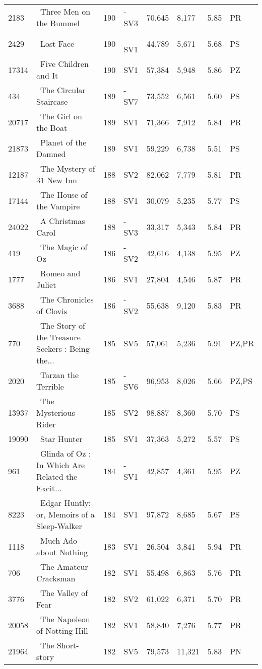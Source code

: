 \begin{longtable}{l | l | l | l | l | l | l | l}
2183 & ~Three Men on the Bummel & 190 & -SV3 & 70,645 & 8,177 & 5.85 & PR\\
2429 & ~Lost Face & 190 & -SV1 & 44,789 & 5,671 & 5.68 & PS\\
17314 & ~Five Children and It & 190 & SV1 & 57,384 & 5,948 & 5.86 & PZ\\
434 & ~The Circular Staircase & 189 & -SV7 & 73,552 & 6,561 & 5.60 & PS\\
20717 & ~The Girl on the Boat & 189 & SV1 & 71,366 & 7,912 & 5.84 & PR\\
21873 & ~Planet of the Damned & 189 & SV1 & 59,229 & 6,738 & 5.51 & PS\\
12187 & ~The Mystery of 31 New Inn & 188 & SV2 & 82,062 & 7,779 & 5.81 & PR\\
17144 & ~The House of the Vampire & 188 & SV1 & 30,079 & 5,235 & 5.77 & PS\\
24022 & ~A Christmas Carol & 188 & -SV3 & 33,317 & 5,343 & 5.84 & PR\\
419 & ~The Magic of Oz & 186 & -SV2 & 42,616 & 4,138 & 5.95 & PZ\\
1777 & ~Romeo and Juliet & 186 & SV1 & 27,804 & 4,546 & 5.87 & PR\\
3688 & ~The Chronicles of Clovis & 186 & -SV2 & 55,638 & 9,120 & 5.83 & PR\\
770 & ~The Story of the Treasure Seekers
: Being the... & 185 & SV5 & 57,061 & 5,236 & 5.91 & PZ,PR\\
2020 & ~Tarzan the Terrible & 185 & -SV6 & 96,953 & 8,026 & 5.66 & PZ,PS\\
13937 & ~The Mysterious Rider & 185 & SV2 & 98,887 & 8,360 & 5.70 & PS\\
19090 & ~Star Hunter & 185 & SV1 & 37,363 & 5,272 & 5.57 & PS\\
961 & ~Glinda of Oz
: In Which Are Related the Excit... & 184 & -SV1 & 42,857 & 4,361 & 5.95 & PZ\\
8223 & ~Edgar Huntly; or, Memoirs of a Sleep-Walker & 184 & SV1 & 97,872 & 8,685 & 5.67 & PS\\
1118 & ~Much Ado about Nothing & 183 & SV1 & 26,504 & 3,841 & 5.94 & PR\\
706 & ~The Amateur Cracksman & 182 & SV1 & 55,498 & 6,863 & 5.76 & PR\\
3776 & ~The Valley of Fear & 182 & SV2 & 61,022 & 6,371 & 5.70 & PR\\
20058 & ~The Napoleon of Notting Hill & 182 & SV1 & 58,840 & 7,276 & 5.77 & PR\\
21964 & ~The Short-story & 182 & SV5 & 79,573 & 11,321 & 5.83 & PN\\

\end{longtable}
